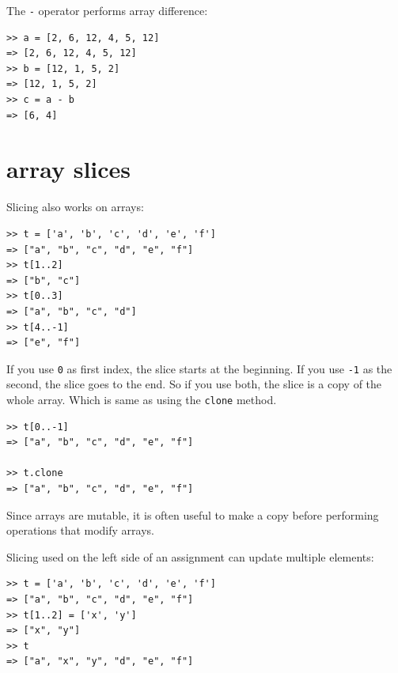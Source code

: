 \documentclass[10pt]{book}
\begin{document}
The {\tt -} operator performs array difference:

\begin{verbatim}
>> a = [2, 6, 12, 4, 5, 12]
=> [2, 6, 12, 4, 5, 12]
>> b = [12, 1, 5, 2]
=> [12, 1, 5, 2]
>> c = a - b
=> [6, 4]
\end{verbatim}

\section{array slices}

Slicing also works on arrays:

\begin{verbatim}
>> t = ['a', 'b', 'c', 'd', 'e', 'f']
=> ["a", "b", "c", "d", "e", "f"]
>> t[1..2]
=> ["b", "c"]
>> t[0..3]
=> ["a", "b", "c", "d"]
>> t[4..-1]
=> ["e", "f"]
\end{verbatim}
%
If you use {\tt 0} as first index, the slice starts at the beginning.
If you use {\tt -1} as the second, the slice goes to the end.  So if you
use both, the slice is a copy of the whole array.  Which is same as
using the {\tt clone} method.

\begin{verbatim}
>> t[0..-1]
=> ["a", "b", "c", "d", "e", "f"]

>> t.clone
=> ["a", "b", "c", "d", "e", "f"]
\end{verbatim}
%
Since arrays are mutable, it is often useful to make a copy
before performing operations that modify arrays.

Slicing used on the left side of an assignment
can update multiple elements:

\begin{verbatim}
>> t = ['a', 'b', 'c', 'd', 'e', 'f']
=> ["a", "b", "c", "d", "e", "f"]
>> t[1..2] = ['x', 'y']
=> ["x", "y"]
>> t
=> ["a", "x", "y", "d", "e", "f"]
\end{verbatim}
%


%
\end{document}
